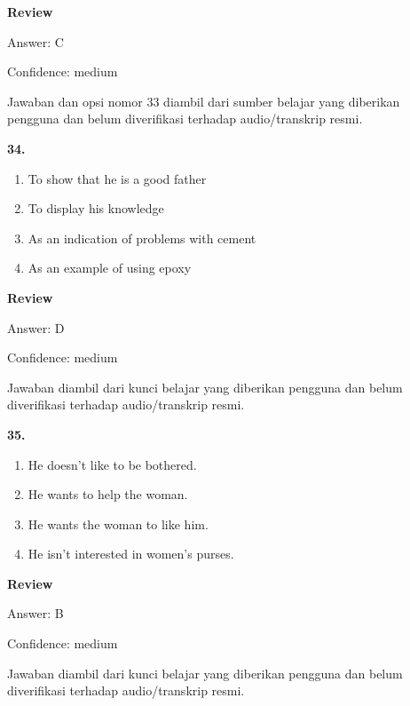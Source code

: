 \documentclass[12pt]{article}
\begin{document}
\textbf{Review}\par
Answer: C\par
Confidence: medium\par
Jawaban dan opsi nomor 33 diambil dari sumber belajar yang diberikan pengguna dan belum diverifikasi terhadap audio/transkrip resmi.\par
\endgroup
\par
\vspace{0.25\baselineskip}
\noindent\textbf{34.}
\begin{enumerate}[label=(\Alph*),leftmargin=*,itemsep=0.2em]
\item To show that he is a good father
\item To display his knowledge
\item As an indication of problems with cement
\item As an example of using epoxy
\end{enumerate}
\par
\begingroup
\setlength{\parskip}{0pt}
\setlength{\parindent}{0pt}
\textbf{Review}\par
Answer: D\par
Confidence: medium\par
Jawaban diambil dari kunci belajar yang diberikan pengguna dan belum diverifikasi terhadap audio/transkrip resmi.\par
\endgroup
\par
\vspace{0.25\baselineskip}
\noindent\textbf{35.}
\begin{enumerate}[label=(\Alph*),leftmargin=*,itemsep=0.2em]
\item He doesn't like to be bothered.
\item He wants to help the woman.
\item He wants the woman to like him.
\item He isn't interested in women's purses.
\end{enumerate}
\par
\begingroup
\setlength{\parskip}{0pt}
\setlength{\parindent}{0pt}
\textbf{Review}\par
Answer: B\par
Confidence: medium\par
Jawaban diambil dari kunci belajar yang diberikan pengguna dan belum diverifikasi terhadap audio/transkrip resmi.\par
\endgroup
\par
\vspace{0.25\baselineskip}
\end{document}
